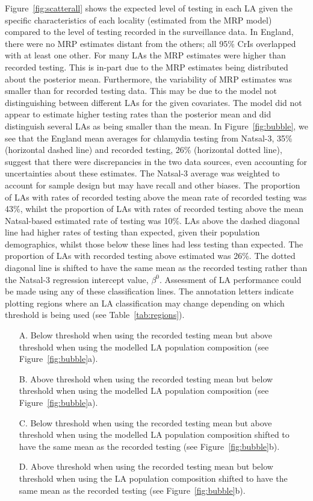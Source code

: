 \documentclass[fleqn,10pt]{wlscirep}
\begin{document}
Figure~\ref{fig:scatterall} shows the expected level of testing in each LA given the specific characteristics of each locality (estimated from the MRP model) compared to the level of testing recorded in the surveillance data. In England, there were no MRP estimates distant from the others; all 95\% CrIs overlapped with at least one other.
For many LAs the MRP estimates were higher than recorded testing. This is in-part due to the MRP estimates being distributed about the posterior mean. Furthermore, the variability of MRP estimates was smaller than for recorded testing data. This may be due to the model not distinguishing between different LAs for the given covariates. The model did not appear to estimate higher testing rates than the posterior mean and did distinguish several LAs as being smaller than the mean. In Figure~\ref{fig:bubble}, we see that the England mean averages for chlamydia testing from Natsal-3, 35\% (horizontal dashed line) and recorded testing, 26\% (horizontal dotted line), suggest that there were discrepancies in the two data sources, even accounting for uncertainties about these estimates. The Natsal-3 average was weighted to account for sample design but may have recall and other biases. The proportion of LAs with rates of recorded testing above the mean rate of recorded testing was 43\%, whilst the proportion of LAs with rates of recorded testing above the mean Natsal-based estimated rate of testing was 10\%. LAs above the dashed diagonal line had higher rates of testing than expected, given their population demographics, whilst those below these lines had less testing than expected. The proportion of LAs with recorded testing above estimated was 26\%. 
The dotted diagonal line is shifted to have the same mean as the recorded testing rather than the Natsal-3 regression intercept value, $\beta^0$. Assessment of LA performance could be made using any of these classification lines. 
The annotation letters indicate plotting regions where an LA classification may change depending on which threshold is being used (see Table~\ref{tab:regions}).
\begin{itemize}
\item[A.] Below threshold when using the recorded testing mean but above threshold when using the modelled LA population composition (see Figure~\ref{fig:bubble}a).
\item[B.] Above threshold when using the recorded testing mean but below threshold when using the modelled LA population composition (see Figure~\ref{fig:bubble}a).
\item[C.] Below threshold when using the recorded testing mean but above threshold when using the modelled LA population composition shifted to have the same mean as the recorded testing (see Figure~\ref{fig:bubble}b).
\item[D.] Above threshold when using the recorded testing mean but below threshold when using the LA population composition shifted to have the same mean as the recorded testing (see Figure~\ref{fig:bubble}b).
\end{itemize}
\end{document}
